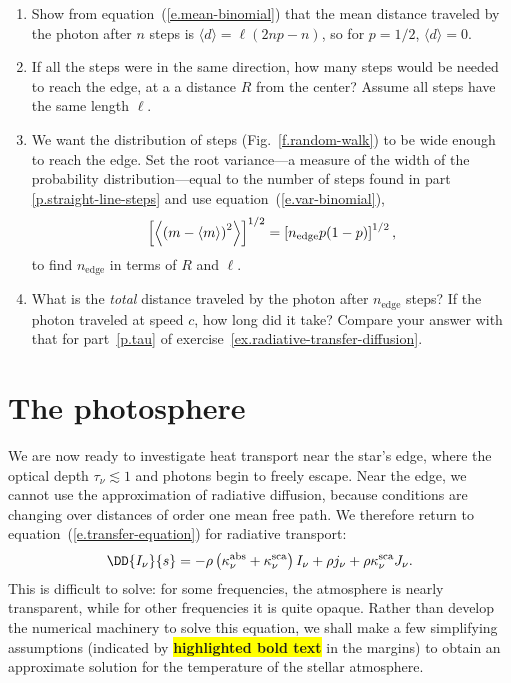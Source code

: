 \begin{exercisebox}
\label{ex.random-walk-diffusion}
\begin{enumerate}
\item
Show from equation~(\ref{e.mean-binomial}) that the mean distance traveled by the photon after $n$ steps is $\langle d\rangle = \ell(2np-n)$, so for $p=1/2$, $\langle d\rangle = 0$.

\item\label{p.straight-line-steps}
If all the steps were in the same direction, how many steps would be needed to reach the edge, at a a distance $R$ from the center? Assume all steps have the same length $\ell$.

\item
We want the distribution of steps (Fig.~\ref{f.random-walk}) to be wide enough to reach the edge. Set the root variance---a measure of the width of the probability distribution---equal to the number of steps found in part \ref{p.straight-line-steps} and use equation~(\ref{e.var-binomial}),
	\[
		\left[\left\langle\left(m-\left\langle m\right\rangle\right)^{2}\right\rangle\right]^{1/2} = 
			\left[n_{\mathrm{edge}}p(1-p)\right]^{1/2},
	\]
	to find $n_{\mathrm{edge}}$ in terms of $R$ and $\ell$.

\item
What is the \emph{total} distance traveled by the photon after $n_{\mathrm{edge}}$ steps? If the photon traveled at speed $c$, how long did it take? Compare your answer with that for part~\ref{p.tau} of exercise~\ref{ex.radiative-transfer-diffusion}.

\end{enumerate}
\end{exercisebox}

\section{The photosphere}

We are now ready to investigate heat transport near the star's edge, where the optical depth $\tau_{\nu} \lesssim 1$ and photons begin to freely escape. Near the edge, we cannot use the approximation of radiative diffusion, because conditions are changing over distances of order one mean free path. We therefore return to equation~(\ref{e.transfer-equation}) for radiative transport:
\[
	\DD{I_{\nu}}{s} = -\rho\left(\kapabs + \kapscat\right) I_{\nu} + \rho j_{\nu} + \rho\kapscat J_{\nu}.
\]
This is difficult to solve: for some frequencies, the atmosphere is nearly transparent, while for other frequencies it is quite opaque. Rather than develop the numerical machinery to solve this equation, we shall make a few simplifying assumptions (indicated by \colorbox{yellow}{\textbf{highlighted bold text}} in the margins) to obtain an approximate solution for the temperature of the stellar atmosphere.

